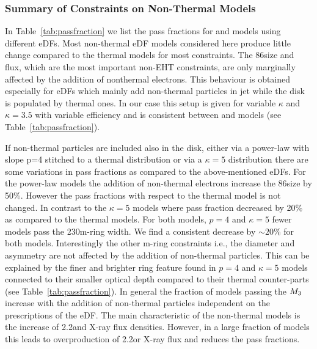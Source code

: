 \subsubsection{Summary of Constraints on Non-Thermal Models}



In Table~\ref{tab:passfraction} we list the pass fractions for \bhac and \hamr models using different eDFs.
Most non-thermal eDF models considered here produce little change compared to the thermal models for most constraints.
The 86\GHz size and flux, which are the most important non-EHT constraints, are only marginally affected by the addition of nonthermal electrons.
This behaviour is obtained especially for eDFs which mainly add non-thermal particles in jet while the disk is populated by thermal ones.
In our case this setup is given for variable $\kappa$ and $\kappa=3.5$ with variable efficiency and is consistent between \bhac and \hamr models (see Table~\ref{tab:passfraction}).

If non-thermal particles are included also in the disk, either via a power-law with slope p=4 stitched to a thermal distribution or via a $\kappa=5$ distribution there are some variations in pass fractions as compared to the above-mentioned eDFs.
For the power-law models the addition of non-thermal electrons increase the 86\GHz size by 50\%.
However the pass fractions with respect to the thermal model is not changed.
In contrast to the $\kappa=5$ models where pass fraction decreased by 20\% as compared to the thermal models.
For both models, $p=4$ and $\kappa=5$ fewer models pass the 230\GHz m-ring width.
We find a consistent decrease by $\sim20\%$ for both models.
Interestingly the other m-ring constraints i.e., the diameter and asymmetry are not affected by the addition of non-thermal particles.
This can be explained by the finer and brighter ring feature found in $p=4$ and $\kappa=5$ models connected to their smaller optical depth compared to their thermal counter-parts (see Table~\ref{tab:passfraction}).
In general the fraction of models passing the $M_{3}$ increase with the addition of non-thermal particles independent on the prescriptions of the eDF.
The main characteristic of the non-thermal models is the increase of 2.2\um and X-ray flux densities.
However, in a large fraction of models this leads to overproduction of 2.2\um or X-ray flux and reduces the pass fractions.


